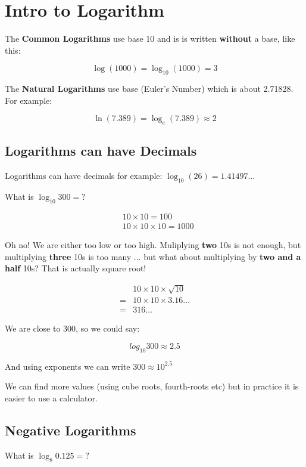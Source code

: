 \section{Intro to Logarithm}

The \textbf{Common Logarithms} use base 10 and is is written \textbf{without} a base, like this:

\[\log (1000)=\log_{10} (1000)=3\]

The \textbf{Natural Logarithms} use base  (Euler's Number) which is about 2.71828. For example:

\[\ln (7.389)=\log_e (7.389) \approx 2\]

\subsection{Logarithms can have Decimals}

Logarithms can have decimals for example: $\log_{10} (26)=1.41497\dotsc$

What is $\log_{10} 300=?$

\begin{align*}
  &10 \times 10=100\\
  &10 \times 10 \times 10=1000
\end{align*}

Oh no! We are either too low or too high. Muliplying \textbf{two} 10s is not enough, but multiplying \textbf{three} 10s is too many ... but what about multiplying by \textbf{two and a half} 10s? That is actually square root!

\begin{align*}
  &10\times 10 \times \sqrt{10}\\
  = &10\times 10 \times 3.16\dotsc\\
  = &316\dotsc
\end{align*}

We are close to 300, so we could say:

\[log_{10} 300 \approx 2.5\]

And using exponents we can write $300 \approx 10^{2.5}$

We can find more values (using cube roots, fourth-roots etc) but in practice it is easier to use a calculator.

\subsection{Negative Logarithms}

What is $\log_8 0.125=?$

